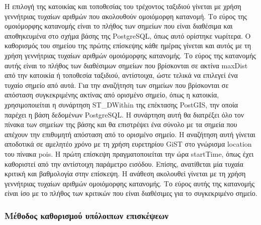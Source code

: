 Η επιλογή της κατοικίας και τοποθεσίας του τρέχοντος ταξιδιού γίνεται με χρήση γεννήτριας τυχαίων αριθμών που ακολουθούν ομοιόμορφη κατανομή. Το εύρος 
της ομοιόμορφης κατανομής είναι το πλήθος των σημείων που είναι διαθέσιμα και αποθηκευμένα στο σχήμα βάσης της PostgreSQL, όπως αυτό ορίστηκε νωρίτερα. 
Ο καθορισμός του σημείου της πρώτης επίσκεψης κάθε ημέρας γίνεται και αυτός με τη χρήση γεννήτριας τυχαίων αριθμών ομοιόμορφης κατανομής. Το εύρος της κατανομής αυτής 
είναι το πλήθος των διαθέσιμων σημείων που βρίσκονται σε ακτίνα maxDist από την κατοικία ή τοποθεσία ταξιδιού, αντίστοιχα, ώστε τελικά να επιλεγεί ένα τυχαίο 
σημείο από αυτά. Για την αναζήτηση των σημείων που βρίσκονται σε απόσταση συγκεκριμένης ακτίνας από ορισμένο σημείο, όπως η κατοικία, χρησιμοποιείται η 
συνάρτηση ST\_DWithin της επέκτασης PostGIS, την οποία παρέχει η βάση δεδομένων PostgreSQL. Η συνάρτηση αυτή θα διατρέξει όλο τον πίνακα των σημείων της βάσης 
και θα επιστρέψει ένα σύνολο με τα σημεία που απέχουν την επιθυμητή απόσταση από το ορισμένο σημείο. Η αναζήτηση αυτή γίνεται αποδοτικά σε αμελητέο χρόνο με τη 
χρήση ευρετηρίου GiST στο γνώρισμα location του πίνακα pois. Η πρώτη επίσκεψη πραγματοποιείται την ώρα startTime, όπως έχει καθοριστεί από την αντίστοιχη 
παράμετρο εισόδου. Επίσης, ανατίθεται μία τυχαία κριτική και βαθμολογία στην επίσκεψη. Η ανάθεση ακολουθεί γίνεται με τη χρήση γεννήτριας τυχαίων αριθμών 
ομοιόμορφης κατανομής. Το εύρος αυτής της κατανομής είναι ίσο με το πλήθος των κριτικών που είναι διαθέσιμες για το συγκεκριμένο σημείο. 

\subsubsection{Μέθοδος καθορισμού υπόλοιπων επισκέψεων}







